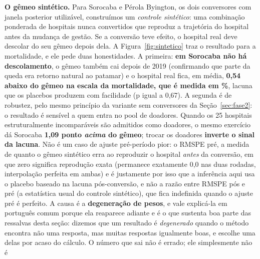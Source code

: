 
\textbf{O gêmeo sintético.} Para Sorocaba e Pérola Byington, os dois
conversores com janela posterior utilizável, construímos um
\emph{controle sintético}: uma combinação ponderada de hospitais nunca
convertidos que reproduz a trajetória do hospital antes da mudança de
gestão. Se a conversão teve efeito, o hospital real deve descolar do
seu gêmeo depois dela. A Figura~\ref{fig:sintetico} traz o resultado
para a mortalidade, e ele pede duas honestidades. A primeira:
\textbf{em Sorocaba não há descolamento}, o gêmeo também cai depois
de 2019 (confirmando que parte da queda era retorno natural ao
patamar) e o hospital real fica, em média, \textbf{0,54 abaixo do gêmeo
na escala da mortalidade, que é medida em \%}, lacuna que os placebos produzem com
facilidade (p igual a 0,67). A segunda é de robustez, pelo mesmo
princípio da variante sem conversores da Seção~\ref{sec:fase2}: o
resultado é sensível a quem entra no pool de doadores. Quando os 25
hospitais estruturalmente incomparáveis são admitidos como doadores, o
mesmo exercício dá Sorocaba \textbf{1,09 ponto \emph{acima} do gêmeo};
trocar os doadores \textbf{inverte o sinal da lacuna}. Não é um caso de ajuste pré-período
pior: o RMSPE pré, a medida de quanto o gêmeo sintético erra ao
reproduzir o hospital \emph{antes} da conversão, em que zero significa
reprodução exata (permanece exatamente 0,0 nas duas rodadas,
interpolação
perfeita em ambas) e é justamente por isso que a inferência aqui usa
o placebo baseado na lacuna pós-conversão, e não a razão entre RMSPE pós
e pré (a estatística usual do controle sintético), que fica indefinida
quando o ajuste pré é perfeito. A causa é a \textbf{degeneração de
pesos}, e vale explicá-la em português comum porque ela reaparece
adiante e é o que sustenta boa parte das ressalvas desta seção: dizemos
que um resultado é \emph{degenerado} quando o método encontra não uma
resposta, mas muitas respostas igualmente boas, e escolhe uma delas por
acaso do cálculo. O número que sai não é errado; ele simplesmente não é
